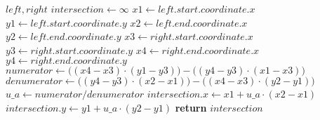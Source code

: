 \begin{algorithm}[!ht]\small
\caption{}
\label{alg:linesegmenintersection}
\begin{algorithmic}[1]
	\Require $\mathit{left}, \mathit{right}$
	\State $\mathit{intersection} \gets \infty$
	\State $\mathit{x1} \gets \mathit{left.start.coordinate.x}$
	\label{alg:linesegmenintersection-var-start}
	\State $\mathit{y1} \gets \mathit{left.start.coordinate.y}$
	\State $\mathit{x2} \gets \mathit{left.end.coordinate.x}$
	\State $\mathit{y2} \gets \mathit{left.end.coordinate.y}$
	\State $\mathit{x3} \gets \mathit{right.start.coordinate.x}$
	\State $\mathit{y3} \gets \mathit{right.start.coordinate.y}$
	\State $\mathit{x4} \gets \mathit{right.end.coordinate.x}$
	\State $\mathit{y4} \gets \mathit{right.end.coordinate.y}$
	\label{alg:linesegmenintersection-var-end}
	\State $\mathit{numerator} \gets \bigl((\mathit{x4} - \mathit{x3}) \cdot (\mathit{y1} - \mathit{y3})\bigr)
	 - \bigl((\mathit{y4} - \mathit{y3}) \cdot (\mathit{x1} - \mathit{x3})\bigr)$
	\label{alg:linesegmenintersection-intersect-start}
	\State $\mathit{denumerator} \gets \bigl((\mathit{y4} - \mathit{y3}) \cdot (\mathit{x2} - \mathit{x1})\bigr)
	 - \bigl((\mathit{x4} - \mathit{x3}) \cdot (\mathit{y2} - \mathit{y1})\bigr)$
	\State $\mathit{u\_a} \gets \mathit{numerator} / \mathit{denumerator}$
	\State $\mathit{intersection.x} \gets \mathit{x1} + \mathit{u\_a} \cdot (\mathit{x2} - \mathit{x1})$
	\State $\mathit{intersection.y} \gets \mathit{y1} + \mathit{u\_a} \cdot (\mathit{y2} - \mathit{y1})$
	\label{alg:linesegmenintersection-intersect-end}
	\State \textbf{return} $\mathit{intersection}$
	\label{alg:linesegmenintersection-return}
\end{algorithmic}
\end{algorithm}
